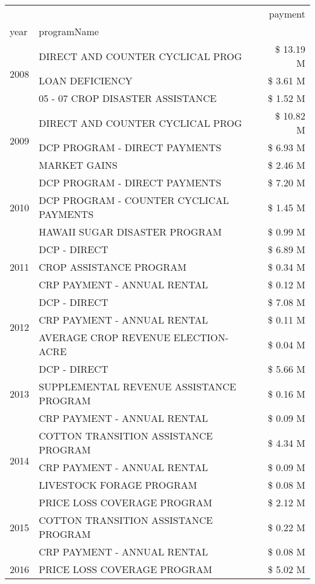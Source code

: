 \begin{tabular}{llr}
\toprule
 &  & payment \\
year & programName &  \\
\midrule
\multirow[t]{3}{*}{2008} & DIRECT AND COUNTER CYCLICAL PROG & \$ 13.19 M \\
 & LOAN DEFICIENCY & \$ 3.61 M \\
 & 05 - 07 CROP DISASTER ASSISTANCE & \$ 1.52 M \\
\cline{1-3}
\multirow[t]{3}{*}{2009} & DIRECT AND COUNTER CYCLICAL PROG & \$ 10.82 M \\
 & DCP PROGRAM - DIRECT PAYMENTS & \$ 6.93 M \\
 & MARKET GAINS & \$ 2.46 M \\
\cline{1-3}
\multirow[t]{3}{*}{2010} & DCP PROGRAM - DIRECT PAYMENTS & \$ 7.20 M \\
 & DCP PROGRAM - COUNTER CYCLICAL PAYMENTS & \$ 1.45 M \\
 & HAWAII SUGAR DISASTER PROGRAM & \$ 0.99 M \\
\cline{1-3}
\multirow[t]{3}{*}{2011} & DCP - DIRECT & \$ 6.89 M \\
 & CROP ASSISTANCE PROGRAM & \$ 0.34 M \\
 & CRP PAYMENT - ANNUAL RENTAL & \$ 0.12 M \\
\cline{1-3}
\multirow[t]{3}{*}{2012} & DCP - DIRECT & \$ 7.08 M \\
 & CRP PAYMENT - ANNUAL RENTAL & \$ 0.11 M \\
 & AVERAGE CROP REVENUE ELECTION-ACRE & \$ 0.04 M \\
\cline{1-3}
\multirow[t]{3}{*}{2013} & DCP - DIRECT & \$ 5.66 M \\
 & SUPPLEMENTAL REVENUE ASSISTANCE PROGRAM & \$ 0.16 M \\
 & CRP PAYMENT - ANNUAL RENTAL & \$ 0.09 M \\
\cline{1-3}
\multirow[t]{3}{*}{2014} & COTTON TRANSITION ASSISTANCE PROGRAM & \$ 4.34 M \\
 & CRP PAYMENT - ANNUAL RENTAL & \$ 0.09 M \\
 & LIVESTOCK FORAGE PROGRAM & \$ 0.08 M \\
\cline{1-3}
\multirow[t]{3}{*}{2015} & PRICE LOSS COVERAGE PROGRAM & \$ 2.12 M \\
 & COTTON TRANSITION ASSISTANCE PROGRAM & \$ 0.22 M \\
 & CRP PAYMENT - ANNUAL RENTAL & \$ 0.08 M \\
\cline{1-3}
\multirow[t]{3}{*}{2016} & PRICE LOSS COVERAGE PROGRAM & \$ 5.02 M \\

\end{tabular}
